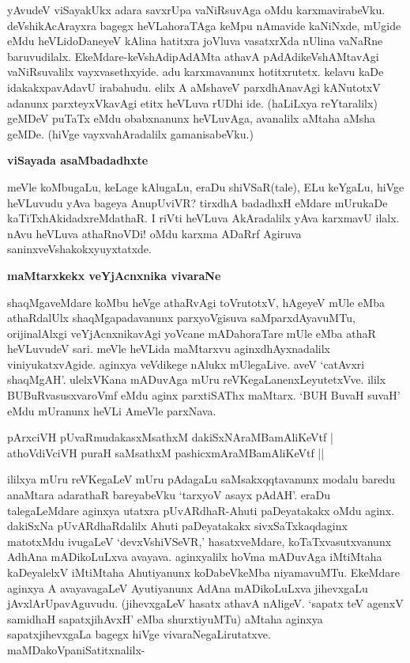 \noindent
yAvudeV viSayakUkx adara savxrUpa vaNiRsuvAga oMdu karxmavirabeVku. 
deVshikAcArayxra bagegx heVLahoraTAga keMpu nAmavide 
kaNiNxde, mUgide eMdu heVLidoDaneyeV kAlina hatitxra joVluva vasatxrXda nUlina vaNaRne baruvudilalx. EkeMdare-keVshAdipAdAMta athavA pAdAdikeVshAMta\-vAgi vaNiRsuvalilx vayxvasethxyide. adu karxmavanunx hotitxrutetx. kelavu kaDe idakakxpavAdavU irabahudu. elilx A aMshaveV parxdhAna\-vAgi kANutotxV adanunx parxteyxVkavAgi etitx heVLuva rUDhi ide. (haLiLxya reYtaralilx) geMDeV puTaTx eMdu obabxnanunx heVLuvAga, avanalilx aMtaha aMsha geMDe. (hiVge vayxvahAradalilx gamanisabeVku.)

{\bigskip
\noindent
{\large\bf viSayada asaMbadadhxte}}\label{page115}
\medskip

\noindent
meVle koMbugaLu, keLage kAlugaLu, eraDu shiVSaR(tale), ELu keYgaLu, hiVge heVLuvudu yAva bageya AnupUviVR? tirxdhA badadhxH eMdare mUrukaDe kaTiTxhAkidadxreMdathaR. I riVti heVLuva AkAradalilx yAva karxmavU ilalx. nAvu heVLuva athaRnoVDi! oMdu karxma ADaRrf Agiruva saninxveVshakokxyuyxtatxde.

{\bigskip
\noindent
{\large\bf maMtarxkekx veYjAcnxnika vivaraNe}}\label{page115}
\medskip

\noindent
shaqMgaveMdare koMbu heVge athaRvAgi toVrutotxV, hAgeyeV mUle eMba athaRdalUlx shaqMga\-pada\-vanunx parxyoVgisuva saMparxdAyavuMTu, orijinalAlxgi veYjAcnxnikavAgi yoVcane mADahoraTare mUle eMba athaR heVLuvudeV sari. meVle heVLida maMtarxvu aginxdhAyxnadalilx viniyukatxvAgide. aginxya veVdikege nAlukx mUlegaLive. aveV `catAvxri shaqMgAH'. ulelxVKana mADuvAga mUru reVKegaLanenxLeyu\-tetxVve. ililx BUBuRvasusxvaroVmf eMdu aginx parxtiSAThx maMtarx. `BUH BuvaH suvaH' eMdu mUranunx heVLi AmeVle parxNava.

\begin{shloka}
pArxciVH pUvaRmudakasxMsathxM dakiSxNAraMBamAliKeVtf |\\\label{115}
athoVdiVciVH puraH saMsathxM pashicxmAraMBamAliKeVtf ||
\end{shloka}

ililxya mUru reVKegaLeV mUru pAdagaLu saMsakxqqtavanunx modalu baredu anaMtara adarathaR bareyabeVku `tarxyoV asayx pAdAH'. eraDu 
talegaLeMdare aginxya\- utatxra pUvARdhaR-Ahuti paDeyatakakx oMdu aginx. dakiSxNa pUvARdhaRdalilx Ahuti paDeyatakakx sivxSaTxkaq\-daginx matotxMdu ivugaLeV `devxVshiVSeVR,' hasatxveMdare, koTaTxvasutxvanunx AdhAna mADikoLuLxva avayava. aginxyalilx hoVma mADuvAga iMtiMtaha kaDeyalelxV iMtiMtaha Ahutiyanunx koDa\-beVkeMba niyama\-vuMTu. EkeMdare aginxya A avayavagaLeV Ayutiyanunx AdAna mADikoLuLxva jihevx\-gaLu jAvxlArUpa\-vAgu\-vudu. (jihevxgaLeV hasatx athavA nAligeV. `sapatx teV agenxV samidhaH sapatxjihAvxH' eMba shurxti\-yuMTu) aMtaha aginxya sapatxjihevxgaLa bagegx hiVge vivaraNegaLirutatxve. maMDakoVpaniSatitxnalilx-

